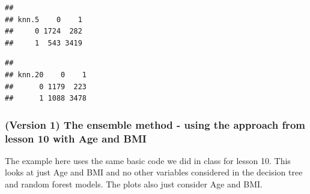 \documentclass[]{article}
\newenvironment{Shaded}{\begin{snugshade}}{\end{snugshade}}
\newcommand{\KeywordTok}[1]{\textcolor[rgb]{0.13,0.29,0.53}{\textbf{{#1}}}}
\newcommand{\DataTypeTok}[1]{\textcolor[rgb]{0.13,0.29,0.53}{{#1}}}
\newcommand{\DecValTok}[1]{\textcolor[rgb]{0.00,0.00,0.81}{{#1}}}
\newcommand{\FloatTok}[1]{\textcolor[rgb]{0.00,0.00,0.81}{{#1}}}
\newcommand{\StringTok}[1]{\textcolor[rgb]{0.31,0.60,0.02}{{#1}}}
\newcommand{\CommentTok}[1]{\textcolor[rgb]{0.56,0.35,0.01}{\textit{{#1}}}}
\newcommand{\NormalTok}[1]{{#1}}
\begin{document}
\begin{Shaded}
\end{Shaded}

\begin{verbatim}
##      
## knn.5    0    1
##     0 1724  282
##     1  543 3419
\end{verbatim}

\begin{Shaded}
\end{Shaded}

\begin{verbatim}
##       
## knn.20    0    1
##      0 1179  223
##      1 1088 3478
\end{verbatim}

\subsubsection{(Version 1) The ensemble method - using the approach from
lesson 10 with Age and
BMI}\label{version-1-the-ensemble-method---using-the-approach-from-lesson-10-with-age-and-bmi-1}

The example here uses the same basic code we did in class for lesson 10.
This looks at just Age and BMI and no other variables considered in the
decision tree and random forest models. The plots also just consider Age
and BMI.

\begin{Shaded}
\end{Shaded}
\end{document}
